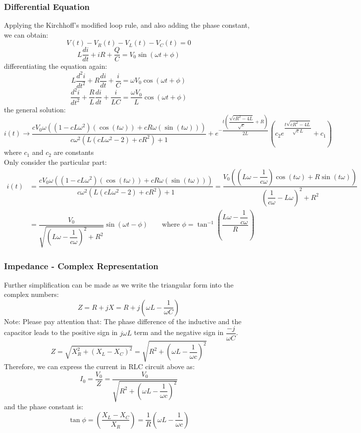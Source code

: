 \documentclass[UTF8]{article}
\begin{document}
\subsubsection{Differential Equation}
Applying the Kirchhoff's modified loop rule, and also adding the phase constant, we can obtain:
$$V(t)-V_R(t)-V_L(t)-V_C(t)=0$$
$$L\dfrac{di}{dt}+iR+\dfrac{Q}{C}=V_0\sin (\omega t+\phi )$$
differentiating the equation again:
$$L\dfrac{d^2i}{dt^2}+R\dfrac{di}{dt}+\dfrac{i}{C}=\omega V_0\cos (\omega t+\phi)$$
$$\dfrac{d^2i}{dt^2}+\dfrac{R}{L}\dfrac{di}{dt}+\dfrac{i}{LC}=\dfrac{\omega V_0}{L}\cos (\omega t+\phi)$$
the general solution:
$$i(t) \to \dfrac{c V_0 \omega  \left(\left(1-c L \omega ^2\right) (\cos  (t \omega ))+c R \omega  (\sin  (t \omega ))\right)}{c \omega ^2 \left(L \left(c L \omega ^2-2\right)+c R^2\right)+1}+e^{-\dfrac{t \left(\dfrac{\sqrt{c R^2-4 L}}{\sqrt{c}}+R\right)}{2 L}} \left(c_2 e^{\dfrac{t \sqrt{c R^2-4 L}}{\sqrt{c} L}}+c_1\right)$$
where $c_1$ and $c_2$ are constants\\
Only consider the particular part:
\begin{align*}
i(t) &= \dfrac{c V_0 \omega  \left(\left(1-c L \omega ^2\right) (\cos  (t \omega ))+c R \omega  (\sin  (t \omega ))\right)}{c \omega ^2 \left(L \left(c L \omega ^2-2\right)+c R^2\right)+1}
=\dfrac{V_0 \left(\left(L \omega -\dfrac{1}{c \omega }\right) \cos (t \omega )+R \sin (t \omega )\right)}{\left(\dfrac{1}{c \omega }-L \omega \right)^2+R^2}\\
&= \dfrac{V_0}{\sqrt{\left(L \omega -\dfrac{1}{c \omega }\right)^2+R^2}}\sin (\omega t -\phi ) \qquad \text{where }\phi=\tan^{-1}\left(\dfrac{L \omega -\dfrac{1}{c \omega }}{R}\right)
\end{align*}

\subsubsection{Impedance - Complex Representation}
Further simplification can be made as we write the triangular form into the complex numbers:
$$Z=R+jX=R+j(\omega L-\dfrac{1}{\omega C})$$
Note: Please pay attention that:
The phase difference of the inductive and the capacitor leads to the positive sign in $j\omega L$ term and the negative sign in $\dfrac{-j}{\omega C}$.  
$$Z=\sqrt{X_R^2+(X_L-X_C)^2}=\sqrt{R^2+(\omega L-\frac{1}{\omega c})^2}$$
Therefore, we can express the current in RLC circuit above as:
$$I_0=\dfrac{V_0}{Z}=\dfrac{V_0}{\sqrt{R^2+(\omega L-\dfrac{1}{\omega c})^2}}$$
and the phase constant is:
$$\tan \phi =\left(\dfrac{X_L-X_C}{X_R}\right)=\dfrac{1}{R}\left(\omega L-\dfrac{1}{\omega c}\right)$$
\end{document}
